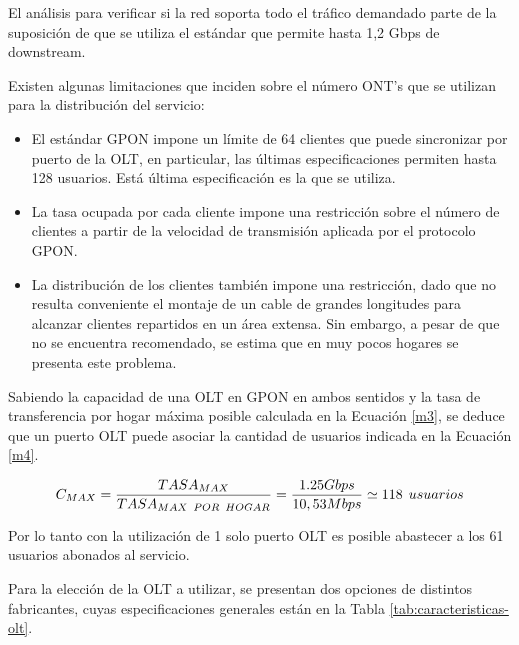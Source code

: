 \begin{enumerate}
\begin{enumerate}
El análisis para verificar si la red soporta todo el tráfico demandado parte de la suposición de que se utiliza el estándar que permite hasta 1,2 Gbps de downstream.


Existen algunas limitaciones que inciden sobre el número ONT’s que se utilizan para la distribución del servicio:
\begin{itemize}
\item El estándar GPON impone un límite de 64 clientes que puede sincronizar por puerto de la OLT, en particular, las últimas especificaciones permiten hasta 128 usuarios. Está última especificación es la que se utiliza.
\item La tasa ocupada por cada cliente impone una restricción sobre el número de clientes a partir de la velocidad de transmisión aplicada por el protocolo GPON.
\item La distribución de los clientes también impone una restricción, dado que no resulta conveniente el montaje de un cable de grandes longitudes para alcanzar clientes repartidos en un área extensa. Sin embargo, a pesar de que no se encuentra recomendado, se estima que en muy pocos hogares se presenta este problema.
\end{itemize}











Sabiendo la capacidad de una OLT en GPON en ambos sentidos y la tasa de transferencia por hogar máxima posible calculada en la Ecuación \ref{m3}, se deduce que un puerto OLT puede asociar la cantidad de usuarios indicada en la Ecuación \ref{m4}.

\begin{equation}
C_{MAX}=\frac{TASA_{MAX}}{TASA_{MAX\hspace{0.15cm}POR\hspace{0.15cm}HOGAR}}=\frac{1.25Gbps}{10,53Mbps}\simeq 118\hspace{0.15cm}usuarios
\label{m4}
\end{equation}

Por lo tanto con la utilización de 1 solo puerto OLT es posible abastecer a los 61 usuarios abonados al servicio.


Para la elección de la OLT a utilizar, se presentan dos opciones de distintos fabricantes, cuyas especificaciones generales están en la Tabla \ref{tab:caracteristicas-olt}.



\end{enumerate}
\end{enumerate}
